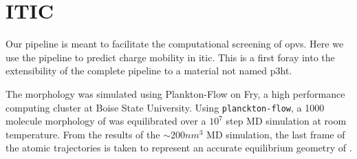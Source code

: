\section{ITIC}

\label{itic}

Our pipeline is meant to facilitate the computational screening of \gls{opv}s.
Here we use the pipeline to predict charge mobility in \gls{itic}.
This is a first foray into the extensibility of the complete pipeline to a
material not named \gls{p3ht}. 

The  morphology was simulated using Plankton-Flow \cite{cmelab} on Fry,         
a high performance computing cluster at Boise State University.  
Using \texttt{planckton-flow}, a 1000
molecule morphology of  was equilibrated over a $10^{7}$ 
step MD simulation at room temperature. 
From the results of the ${\sim}200nm^{3}$ MD simulation, the last frame of the atomic
trajectories is taken to represent an accurate equilibrium geometry
of . 

